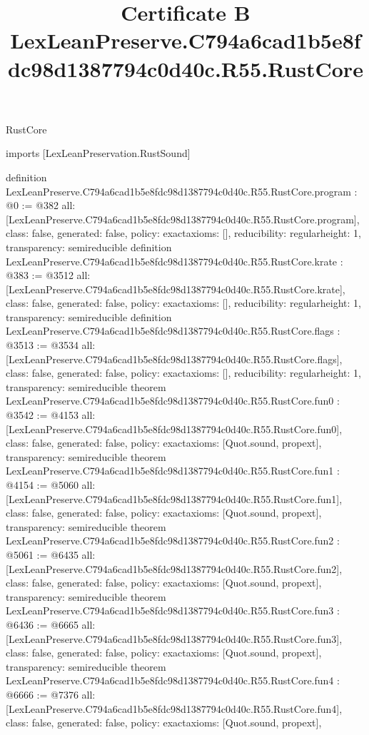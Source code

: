 \begin{lexlean}{RustCore}
\title{Certificate B LexLeanPreserve.C794a6cad1b5e8fdc98d1387794c0d40c.R55.RustCore}
\begin{coremodule}
imports [LexLeanPreservation.RustSound]

definition LexLeanPreserve.C794a6cad1b5e8fdc98d1387794c0d40c.R55.RustCore.program : @0 := @382 {
  all: [LexLeanPreserve.C794a6cad1b5e8fdc98d1387794c0d40c.R55.RustCore.program],
  class: false,
  generated: false,
  policy: exact{axioms: []},
  reducibility: regular{height: 1},
  transparency: semireducible
}
definition LexLeanPreserve.C794a6cad1b5e8fdc98d1387794c0d40c.R55.RustCore.krate : @383 := @3512 {
  all: [LexLeanPreserve.C794a6cad1b5e8fdc98d1387794c0d40c.R55.RustCore.krate],
  class: false,
  generated: false,
  policy: exact{axioms: []},
  reducibility: regular{height: 1},
  transparency: semireducible
}
definition LexLeanPreserve.C794a6cad1b5e8fdc98d1387794c0d40c.R55.RustCore.flags : @3513 := @3534 {
  all: [LexLeanPreserve.C794a6cad1b5e8fdc98d1387794c0d40c.R55.RustCore.flags],
  class: false,
  generated: false,
  policy: exact{axioms: []},
  reducibility: regular{height: 1},
  transparency: semireducible
}
theorem LexLeanPreserve.C794a6cad1b5e8fdc98d1387794c0d40c.R55.RustCore.fun0 : @3542 := @4153 {
  all: [LexLeanPreserve.C794a6cad1b5e8fdc98d1387794c0d40c.R55.RustCore.fun0],
  class: false,
  generated: false,
  policy: exact{axioms: [Quot.sound, propext]},
  transparency: semireducible
}
theorem LexLeanPreserve.C794a6cad1b5e8fdc98d1387794c0d40c.R55.RustCore.fun1 : @4154 := @5060 {
  all: [LexLeanPreserve.C794a6cad1b5e8fdc98d1387794c0d40c.R55.RustCore.fun1],
  class: false,
  generated: false,
  policy: exact{axioms: [Quot.sound, propext]},
  transparency: semireducible
}
theorem LexLeanPreserve.C794a6cad1b5e8fdc98d1387794c0d40c.R55.RustCore.fun2 : @5061 := @6435 {
  all: [LexLeanPreserve.C794a6cad1b5e8fdc98d1387794c0d40c.R55.RustCore.fun2],
  class: false,
  generated: false,
  policy: exact{axioms: [Quot.sound, propext]},
  transparency: semireducible
}
theorem LexLeanPreserve.C794a6cad1b5e8fdc98d1387794c0d40c.R55.RustCore.fun3 : @6436 := @6665 {
  all: [LexLeanPreserve.C794a6cad1b5e8fdc98d1387794c0d40c.R55.RustCore.fun3],
  class: false,
  generated: false,
  policy: exact{axioms: [Quot.sound, propext]},
  transparency: semireducible
}
theorem LexLeanPreserve.C794a6cad1b5e8fdc98d1387794c0d40c.R55.RustCore.fun4 : @6666 := @7376 {
  all: [LexLeanPreserve.C794a6cad1b5e8fdc98d1387794c0d40c.R55.RustCore.fun4],
  class: false,
  generated: false,
  policy: exact{axioms: [Quot.sound, propext]},
}
\end{coremodule}
\end{lexlean}
